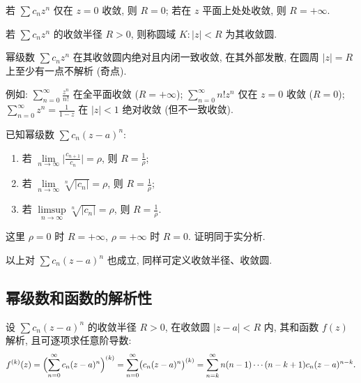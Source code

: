 \documentclass[theorem=false,mathfont=none,openany,sub3section]{easybook}
\begin{document}
\begin{remark}
  若 $\sum c_{n}z^{n}$ 仅在 $z=0$ 收敛, 则 $R=0$; 若在 $z$ 平面上处处收敛, 则 $R=+\infty$.
\end{remark}

\begin{definition}
  若 $\sum c_{n}z^{n}$ 的收敛半径 $R>0$, 则称圆域 $K:|z|<R$ 为其收敛圆.
\end{definition}

\begin{remark}
  幂级数 $\sum c_{n}z^{n}$ 在其收敛圆内绝对且内闭一致收敛, 在其外部发散, 在圆周 $|z|=R$ 上至少有一点不解析 (奇点).

  例如: $\sum_{n=0}^{\infty}\frac{z^{n}}{n!}$ 在全平面收敛 ($R=+\infty$); $\sum_{n=0}^{\infty}n!z^{n}$ 仅在 $z=0$ 收敛 ($R=0$);
  $\sum_{n=0}^{\infty}z^{n}=\frac{1}{1-z}$ 在 $|z|<1$ 绝对收敛 (但不一致收敛).
\end{remark}

\begin{theorem}
  已知幂级数 $\sum c_{n}(z-a)^{n}$:
  \begin{enumerate}
    \item 若 $\lim\limits_{n\to\infty}\bigl|\frac{c_{n+1}}{c_{n}}\bigr|=\rho$, 则 $R=\frac{1}{\rho}$;
    \item 若 $\lim\limits_{n\to\infty}\sqrt[n]{|c_{n}|}=\rho$, 则 $R=\frac{1}{\rho}$;
    \item 若 $\limsup\limits_{n\to\infty}\sqrt[n]{|c_{n}|}=\rho$, 则 $R=\frac{1}{\rho}$.
  \end{enumerate}
\end{theorem}

\begin{remark}
  这里 $\rho=0$ 时 $R=+\infty$, $\rho=+\infty$ 时 $R=0$. 证明同于实分析.
\end{remark}

以上对 $\sum c_{n}(z-a)^{n}$ 也成立, 同样可定义收敛半径、收敛圆.

\subsection{幂级数和函数的解析性}

\begin{theorem}
  设 $\sum c_{n}(z-a)^{n}$ 的收敛半径 $R>0$, 在收敛圆 $|z-a|<R$ 内, 其和函数 $f(z)$ 解析, 且可逐项求任意阶导数:
  \[
  f^{(k)}(z)=\Bigl(\sum_{n=0}^{\infty}c_{n}(z-a)^{n}\Bigr)^{(k)}
  =\sum_{n=0}^{\infty}\bigl(c_{n}(z-a)^{n}\bigr)^{(k)}
  =\sum_{n=k}^{\infty}n(n-1)\cdots(n-k+1)c_{n}(z-a)^{n-k}.
  \]
\end{theorem}
\end{document}
